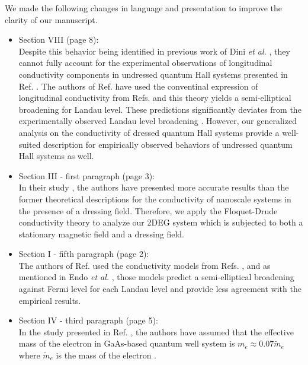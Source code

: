 \documentclass{article}
\begin{document}
We made the following changes in language and presentation to improve the clarity of our manuscript.

\begin{itemize}
  \item Section VIII (page 8):\\
  {\color{Red}
  Despite this behavior being identified in previous work of Dini \textit{et al.}  \cite{dini16}, they cannot fully account for the experimental observations of longitudinal conductivity components in undressed quantum Hall systems presented in Ref. \cite{endo09}. The authors of Ref. \cite{dini16} have used the conventinal expression of longitudinal conductivity from Refs. \cite{ando74_1,ando82} and this theory yields a semi-elliptical broadening for Landau level. These predictions significantly deviates from the experimentally observed Landau level broadening \cite{endo09}.
  However, our generalized analysis on the conductivity of dressed quantum Hall systems provide a well-suited description for empirically observed behaviors of undressed quantum Hall systems as well.
  }
  \item Section III - first paragraph (page 3):\\
  {\color{Red}
  In their study \cite{wackerl20}, the authors have presented more accurate results than the former theoretical descriptions \cite{morina15,pervishko15} for the conductivity of nanoscale systems in the  presence of a dressing field. Therefore, we apply the Floquet-Drude conductivity theory to analyze our 2DEG system which is subjected to both a stationary magnetic field and a dressing field.
  }
  \item Section I - fifth paragraph (page 2):\\
  {\color{Red}
  The authors of Ref. \cite{dini16} used the conductivity models from Refs. \cite{ando74_1,ando82}, and as mentioned in Endo \textit{et al.} \cite{endo09}, those models predict a semi-elliptical broadening against Fermi level for each Landau level and provide less agreement with the empirical results.
  }
  \item Section IV - third paragraph (page 5):\\
  {\color{Red}
  In the study presented in Ref. \cite{endo09}, the authors have assumed that the effective mass of the electron in GaAs-based quantum well system is $m_e \approx 0.07\widetilde{m}_e$ where $\widetilde{m}_e$ is the mass of the electron \cite{endo09,winkler03,wackerl20}.
  }
\end{itemize}
\end{document}
